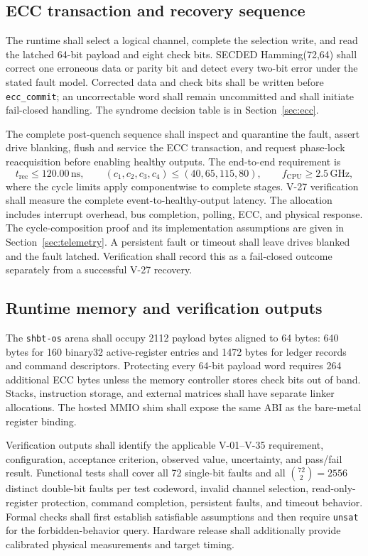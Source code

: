 \documentclass[11pt,a4paper]{article}
\newcommand{\unit}[1]{\,\mathrm{#1}}
\newcommand{\shbtos}{\texttt{shbt-os}}
\begin{document}
\subsection{ECC transaction and recovery sequence}
The runtime shall select a logical channel, complete the selection write, and read
the latched 64-bit payload and eight check bits. SECDED Hamming(72,64) shall correct
one erroneous data or parity bit and detect every two-bit error under the stated
fault model. Corrected data and check bits shall be written before
\texttt{ecc\_commit}; an uncorrectable word shall remain uncommitted and shall
initiate fail-closed handling. The syndrome decision table is in Section~\ref{sec:ecc}.

The complete post-quench sequence shall inspect and quarantine the fault, assert
drive blanking, flush and service the ECC transaction, and request phase-lock
reacquisition before enabling healthy outputs. The end-to-end requirement is
\[
 t_{\mathrm{rec}}\le120.00\unit{ns},\qquad
 (c_1,c_2,c_3,c_4)\le(40,65,115,80),\qquad
 f_{\mathrm{CPU}}\ge2.5\unit{GHz},
\]
where the cycle limits apply componentwise to complete stages. V-27 verification
shall measure the complete event-to-healthy-output latency. The allocation
includes interrupt overhead, bus completion, polling, ECC, and physical response.
The cycle-composition proof and its implementation assumptions are given in
Section~\ref{sec:telemetry}. A persistent fault or timeout shall leave drives
blanked and the fault latched. Verification shall record this as a fail-closed
outcome separately from a successful V-27 recovery.

\subsection{Runtime memory and verification outputs}
The \shbtos{} arena shall occupy 2112 payload bytes aligned to 64 bytes: 640 bytes
for 160 binary32 active-register entries and 1472 bytes for ledger records and
command descriptors. Protecting every 64-bit payload word requires 264 additional
ECC bytes unless the memory controller stores check bits out of band. Stacks,
instruction storage, and external matrices shall have separate linker allocations.
The hosted MMIO shim shall expose the same ABI as the bare-metal register binding.

Verification outputs shall identify the applicable V-01--V-35 requirement,
configuration, acceptance criterion, observed value, uncertainty, and pass/fail
result. Functional tests shall cover all 72 single-bit faults and all
$\binom{72}{2}=2556$ distinct double-bit faults per test codeword, invalid channel
selection, read-only-register protection, command completion, persistent faults,
and timeout behavior. Formal checks shall first establish satisfiable assumptions
and then require \texttt{unsat} for the forbidden-behavior query. Hardware release
shall additionally provide calibrated physical measurements and target timing.
\end{document}
